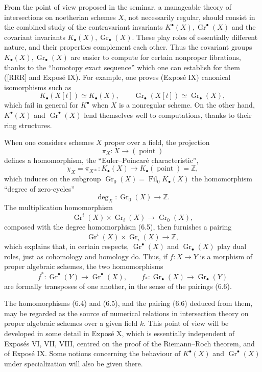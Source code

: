 \documentclass[11pt]{article}
\newcommand{\Gr}{\operatorname{Gr}}
\newcommand{\Fil}{\operatorname{Fil}}
\providecommand{\Gr}{\operatorname{Gr}}
\providecommand{\Gr}{\operatorname{G}}
\begin{document}
From the point of view proposed in the seminar, a manageable theory of intersections on noetherian schemes $X$, not necessarily regular, should consist in the combined study of the contravariant invariants $K^\bullet(X),\Gr^\bullet(X)$ and the covariant invariants $K_\bullet(X),\Gr_\bullet(X)$. These play roles of essentially different nature, and their properties complement each other. Thus the covariant groups $K_\bullet(X),\Gr_\bullet(X)$ are easier to compute for certain nonproper fibrations, thanks to the ``homotopy exact sequence'' which one can establish for them ([RRR] and Expos\'e IX). For example, one proves (Expos\'e IX) canonical isomorphisms such as
\[
K_\bullet(X[t])\simeq K_\bullet(X),\qquad \Gr_\bullet(X[t])\simeq \Gr_\bullet(X),
\]
which fail in general for $K^\bullet$ when $X$ is a nonregular scheme. On the other hand, $K^\bullet(X)$ and $\Gr^\bullet(X)$ lend themselves well to computations, thanks to their ring structures.

When one considers schemes $X$ proper over a field, the projection
\[
\pi_X:X\longrightarrow (\operatorname{point})
\]
defines a homomorphism, the ``Euler--Poincar\'e characteristic'',
\begin{equation}\tag{6.4}
\chi_X=\pi_{X*}:K_\bullet(X)\longrightarrow K_\bullet(\operatorname{point})=\mathbb Z,
\end{equation}
which induces on the subgroup $\Gr_0(X)=\Fil_0K_\bullet(X)$ the homomorphism ``degree of zero-cycles''
\begin{equation}\tag{6.5}
\deg_X:\Gr_0(X)\longrightarrow \mathbb Z.
\end{equation}
The multiplication homomorphism
\[
\Gr^i(X)\times \Gr_i(X)\longrightarrow \Gr_0(X),
\]
composed with the degree homomorphism (6.5), then furnishes a pairing
\begin{equation}\tag{6.6}
\Gr^i(X)\times \Gr_i(X)\longrightarrow \mathbb Z,
\end{equation}
which explains that, in certain respects, $\Gr^\bullet(X)$ and $\Gr_\bullet(X)$ play dual roles, just as cohomology and homology do. Thus, if $f:X\to Y$ is a morphism of proper algebraic schemes, the two homomorphisms
\[
f^*:\Gr^\bullet(Y)\longrightarrow \Gr^\bullet(X),\qquad f_*:\Gr_\bullet(X)\longrightarrow \Gr_\bullet(Y)
\]
are formally transposes of one another, in the sense of the pairings (6.6).

The homomorphisms (6.4) and (6.5), and the pairing (6.6) deduced from them, may be regarded as the source of numerical relations in intersection theory on proper algebraic schemes over a given field $k$. This point of view will be developed in some detail in Expos\'e X, which is essentially independent of Expos\'es VI, VII, VIII, centred on the proof of the Riemann--Roch theorem, and of Expos\'e IX. Some notions concerning the behaviour of $K^\bullet(X)$ and $\Gr^\bullet(X)$ under specialization will also be given there.
\end{document}
